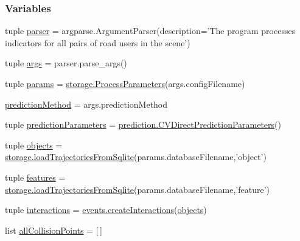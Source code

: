 \subsubsection*{Variables}
\begin{DoxyCompactItemize}
\item 
tuple \hyperlink{namespacesafety-analysis_a77f1f12446258d158fe4c175f2e00c8a}{parser} = argparse.\-Argument\-Parser(description='The program processes indicators for all pairs of road users in the scene')
\item 
tuple \hyperlink{namespacesafety-analysis_a9f08d35d57b8c8de45bf749f286a2583}{args} = parser.\-parse\-\_\-args()
\item 
tuple \hyperlink{namespacesafety-analysis_a4cb92f5f2e336a81cd2d9dda6270e90c}{params} = \hyperlink{classstorage_1_1ProcessParameters}{storage.\-Process\-Parameters}(args.\-config\-Filename)
\item 
\hyperlink{namespacesafety-analysis_af447253965234be3b5a97d6867eb3864}{prediction\-Method} = args.\-prediction\-Method
\item 
tuple \hyperlink{namespacesafety-analysis_abff9643a4f33b02547c31562a8ca4fd3}{prediction\-Parameters} = \hyperlink{classprediction_1_1CVDirectPredictionParameters}{prediction.\-C\-V\-Direct\-Prediction\-Parameters}()
\item 
tuple \hyperlink{namespacesafety-analysis_abe49e0670b51364da374434e6b2ba136}{objects} = \hyperlink{namespacestorage_aaafba9f6bc0816ff0084df5e1d892a9d}{storage.\-load\-Trajectories\-From\-Sqlite}(params.\-database\-Filename,'object')
\item 
tuple \hyperlink{namespacesafety-analysis_ae9335dec1cbe36b77f4b7a9ad2c55220}{features} = \hyperlink{namespacestorage_aaafba9f6bc0816ff0084df5e1d892a9d}{storage.\-load\-Trajectories\-From\-Sqlite}(params.\-database\-Filename,'feature')
\item 
tuple \hyperlink{namespacesafety-analysis_a5f62d113cdd0f010dea27ffeadbd4f80}{interactions} = \hyperlink{namespaceevents_a6bb1ae1f6c4390259f31283b42e47226}{events.\-create\-Interactions}(\hyperlink{namespacesafety-analysis_abe49e0670b51364da374434e6b2ba136}{objects})
\item 
list \hyperlink{namespacesafety-analysis_ab53934f4c9486b74c7246f4cd76cdadc}{all\-Collision\-Points} = \mbox{[}$\,$\mbox{]}
\end{DoxyCompactItemize}



